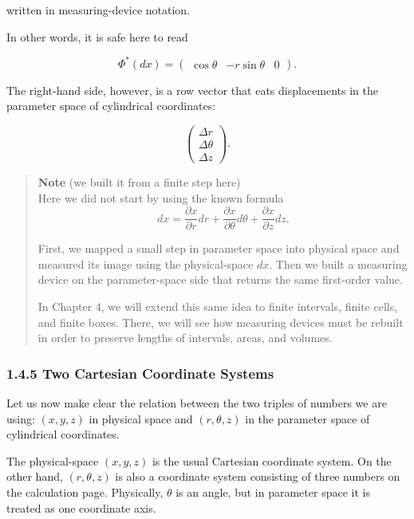 \documentclass[a4paper,12pt,openany]{book}
\begin{document}
written in measuring-device notation.

In other words, it is safe here to read

\[
\Phi^*(dx)
=
\begin{pmatrix}
\cos\theta & -r\sin\theta & 0
\end{pmatrix}.
\]

The right-hand side, however, is a row vector that eats displacements in
the parameter space of cylindrical coordinates:

\[
\begin{pmatrix}
\Delta r\\
\Delta\theta\\
\Delta z
\end{pmatrix}.
\]

\begin{quote}
\textbf{Note} (we built it from a finite step here)\\
Here we did not start by using the known formula \[
dx=\frac{\partial x}{\partial r}dr+\frac{\partial x}{\partial\theta}d\theta+\frac{\partial x}{\partial z}dz.
\]

First, we mapped a small step in parameter space into physical space and
measured its image using the physical-space \(dx\). Then we built a
measuring device on the parameter-space side that returns the same
first-order value.

In Chapter 4, we will extend this same idea to finite intervals, finite
cells, and finite boxes. There, we will see how measuring devices must
be rebuilt in order to preserve lengths of intervals, areas, and
volumes.
\end{quote}

\hypertarget{two-cartesian-coordinate-systems}{%
\subsubsection{1.4.5 Two Cartesian Coordinate
Systems}\label{two-cartesian-coordinate-systems}}

Let us now make clear the relation between the two triples of numbers we
are using: \((x,y,z)\) in physical space and \((r,\theta,z)\) in the
parameter space of cylindrical coordinates.

The physical-space \((x,y,z)\) is the usual Cartesian coordinate system.
On the other hand, \((r,\theta,z)\) is also a coordinate system
consisting of three numbers on the calculation page. Physically,
\(\theta\) is an angle, but in parameter space it is treated as one
coordinate axis.
\end{document}
